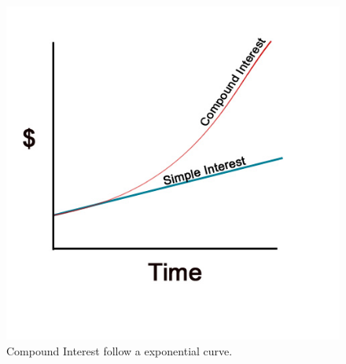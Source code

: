 \documentclass[
	11pt, %
	handout,
]{beamer}
\begin{document}
\begin{frame}
\begin{columns}[t]
		\begin{column}{0.5\textwidth} %
			\begin{figure}
				\includegraphics[width=\linewidth]{Simple_Interest_Compound_Interest.jpeg}
				\caption{Compound Interest follow a exponential curve.}
			\end{figure}
    \end{column}
	\end{columns}
\end{frame}
\end{document}
